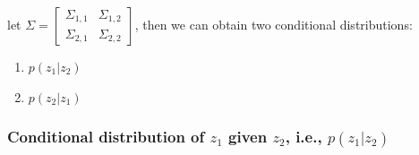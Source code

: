 \documentclass{article}
\begin{document}
let $\Sigma = \begin{bmatrix} \Sigma_{1,1} & \Sigma_{1,2} \\ \Sigma_{2,1} & \Sigma_{2,2}\end{bmatrix}$, then we can obtain two conditional distributions:

\begin{enumerate}
\item $p(z_1 | z_2)$
\item $p(z_2 | z_1)$
\end{enumerate}

\subsubsection{Conditional distribution of $z_1$ given $z_2$, i.e., $p(z_1 | z_2)$}
\end{document}
